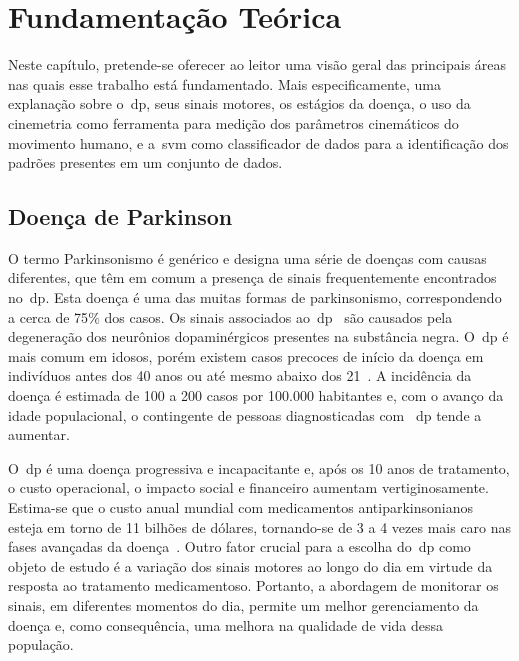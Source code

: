 \chapter{Fundamentação Teórica}\label{chapter:fundamentacao}
Neste capítulo, pretende-se oferecer ao leitor uma visão geral das principais áreas nas quais esse trabalho está fundamentado. Mais especificamente, uma explanação sobre o~\ac{dp}, seus sinais motores, os estágios da doença, o uso da cinemetria como ferramenta para medição dos parâmetros cinemáticos do movimento humano, e a~\ac{svm} como classificador de dados para a identificação dos padrões presentes em um conjunto de dados.


\section{Doença de Parkinson}\label{section:doenca_parkinson}
O termo Parkinsonismo é genérico e designa uma série de doenças com causas diferentes, que têm em comum a presença de sinais frequentemente encontrados no~\ac{dp}. Esta doença é uma das muitas formas de parkinsonismo, correspondendo a cerca de 75$\%$ dos casos. Os sinais associados ao~\ac{dp}~\cite{protpar010} são causados pela degeneração dos neurônios dopaminérgicos presentes na substância negra. O~\ac{dp} é mais comum em idosos, porém existem casos precoces de início da doença em indivíduos antes dos 40 anos ou até mesmo abaixo dos 21~\cite{menezes2003}. A incidência da doença é estimada de 100 a 200 casos por 100.000 habitantes e, com o avanço da idade populacional, o contingente de pessoas diagnosticadas com ~\ac{dp} tende a aumentar.

O~\ac{dp} é uma doença progressiva e incapacitante e, após os 10 anos de tratamento, o custo operacional, o impacto social e financeiro aumentam vertiginosamente. Estima-se que o custo anual mundial com medicamentos antiparkinsonianos esteja em torno de 11 bilhões de dólares, tornando-se de 3 a 4 vezes mais caro nas fases avançadas da doença~\cite{protpar010}. Outro fator crucial para a escolha do~\ac{dp} como objeto de estudo é a variação dos sinais motores ao longo do dia em virtude da resposta ao tratamento medicamentoso. Portanto, a abordagem de monitorar os sinais, em diferentes momentos do dia, permite um melhor gerenciamento da doença e, como consequência, uma melhora na qualidade de vida dessa população.


